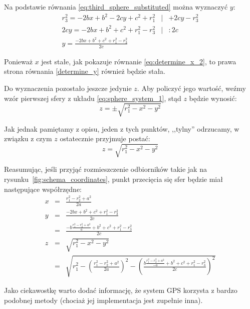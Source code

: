 Na podstawie równania \ref{eq:third_sphere_substituted} można wyznaczyć $y$:
\begin{eqnarray}
 r_3^2 = -2bx + b^2 - 2cy + c^2 + r_1^2 & | & +2cy - r_3^2 \\
 2cy   = -2bx + b^2 + c^2 + r_1^2 - r_3^2 & | & \colon 2c \\
 y     = \frac{-2bx + b^2 + c^2 + r_1^2 - r_3^2}{2c} & & \label{determine_y}
\end{eqnarray}

Ponieważ $x$ jest stałe, jak pokazuje równanie \ref{eq:determine_x_2}, to prawa strona równania \ref{determine_y} również będzie stała.

Do wyznaczenia pozostało jeszcze jedynie $z$. Aby policzyć jego wartość, weźmy wzór pierwszej sfery z układu \ref{eq:sphere_system_1}, stąd $z$ będzie wynosić:
\begin{equation}
 z = \pm\sqrt{r_1^2 - x^2 - y^2}
\end{equation}

Jak jednak pamiętamy z opisu, jeden z tych punktów, ,,tylny'' odrzucamy, w związku z czym $z$ ostatecznie przyjmuje postać:
\begin{equation}
 z = \sqrt{r_1^2 - x^2 - y^2}
\end{equation}

Reasumując, jeśli przyjąć rozmieszczenie odbiorników takie jak na rysunku~\ref{fig:schema_coordinates}, punkt przecięcia się sfer będzie miał następujące współrzędne:
\begin{eqnarray}
 x & = & \frac{r_1^2 - r_2^2 + a^2}{2a} \label{eq:trilateration_final_x}\\
 y & = & \frac{-2bx + b^2 + c^2 + r_1^2 - r_3^2}{2c} \label{eq:trilateration_final_y}\\
   & = & \frac{-b\frac{r_1^2 - r_2^2 + a^2}{a} + b^2 + c^2 + r_1^2 - r_3^2}{2c} \nonumber \\
 z & = & \sqrt{r_1^2 - x^2 - y^2} \label{eq:trilateration_final_z}\\
   & = & \sqrt{r_1^2 - \left(\frac{r_1^2 - r_2^2 + a^2}{2a}\right)^2 - \left(\frac{b\frac{r_1^2 - r_2^2 + a^2}{-a} + b^2 + c^2 + r_1^2 - r_3^2}{2c}\right)^2} \nonumber
\end{eqnarray}

Jako ciekawostkę warto dodać informację, że system \textsc{GPS} korzysta z bardzo podobnej metody (chociaż jej implementacja jest zupełnie inna).
